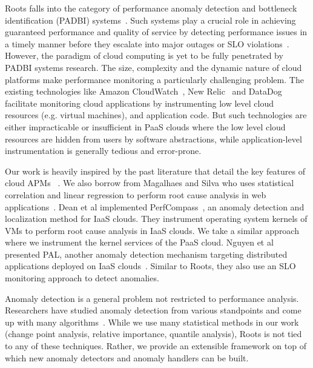 Roots falls into the category of performance anomaly detection and bottleneck identification 
(PADBI) systems~\cite{Ibidunmoye:2015:PAD:2808687.2791120}. 
Such systems play a crucial role in achieving guaranteed performance and
quality of service by detecting performance issues in a timely manner before they escalate into major outages
or SLO violations~\cite{6045942}. 
However, the paradigm of cloud computing is yet to be
fully penetrated by PADBI systems research. The size, complexity and the dynamic nature of 
cloud platforms make performance monitoring a particularly challenging problem.
The existing technologies like Amazon CloudWatch~\cite{cloudwatch},
New Relic~\cite{newrelic} and DataDog~\cite{datadog} facilitate monitoring cloud applications 
by instrumenting low level cloud resources (e.g. virtual machines), and application code. But such technologies
are either impracticable or insufficient in
PaaS clouds where the low level cloud resources are hidden from users by software abstractions, while
application-level instrumentation is generally tedious and error-prone.

Our work is heavily inspired by the past literature that detail the key features of 
cloud APMs~\cite{DaCunhaRodrigues:2016:MCC:2851613.2851619,Ibidunmoye:2015:PAD:2808687.2791120} . 
We also borrow from
Magalhaes and Silva who uses statistical correlation and linear regression to perform
root cause analysis in web applications~\cite{Magalhaes:2010:DPA:1906485.1906774, Magalhaes:2011:RAP:1982185.1982234}. 
Dean et al implemented PerfCompass~\cite{Dean:2014:PTR:2696535.2696551}, 
an anomaly detection and localization method for IaaS clouds. They instrument operating system kernels
of VMs to perform root cause analysis in IaaS clouds. We take a similar approach where we instrument
the kernel services of the PaaS cloud.
Nguyen et al presented PAL, another anomaly detection mechanism targeting
distributed applications deployed on IaaS clouds~\cite{Nguyen:2011:PPR:2038633.2038634}. 
Similar to Roots, they also use an SLO monitoring approach to detect anomalies.

Anomaly detection is a general problem not restricted to performance analysis. Researchers
have studied anomaly detection from various standpoints and come up with many
algorithms~\cite{Chandola:2009:ADS:1541880.1541882}.
While we use many statistical methods
in our work (change point analysis, relative importance, quantile analysis), Roots is not tied to any of these
techniques. Rather, we provide an extensible framework on top of which new anomaly detectors and anomaly
handlers can be built.